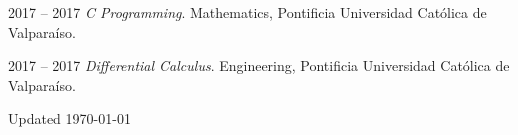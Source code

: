 \documentclass[12pt,letterpaper]{report}
\begin{document}
\begin{tablist}

        \item[2017 -- 2017] \tab \emph{C Programming}. Mathematics, Pontificia Universidad Cat\'olica de Valpara\'iso. 
            
        \item[2017 -- 2017] \tab \emph{Differential Calculus}. Engineering, Pontificia Universidad Cat\'olica de Valpara\'iso. 

    \end{tablist}
    \begin{center}
        \vfill
        Updated \monthyeardate\today
    \end{center}
\end{document}
